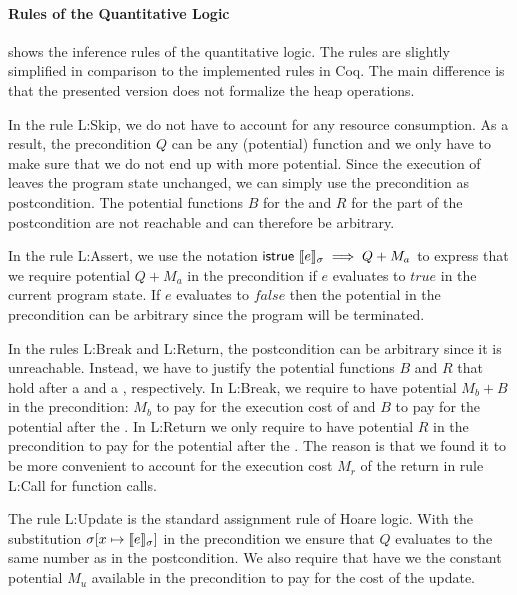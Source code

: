 \documentclass[nocopyrightspace,preprint]{sigplanconf}
\newcommand{\pref}[1]{\prettyref{#1}}
\begin{document}
\paragraph{Rules of the Quantitative Logic}

\pref{fig:logic} shows the inference rules of the quantitative logic.
The rules are slightly simplified in comparison to the implemented
rules in Coq.  The main difference is that the presented version does
not formalize the heap operations.

In the rule {\sc L:Skip}, we do not have to account for any resource
consumption.  As a result, the precondition $Q$ can be any (potential)
function and we only have to make sure that we do not end up with more
potential.  Since the execution of  leaves the program
state unchanged, we can simply use the precondition as postcondition.
The potential functions $B$ for the  and $R$ for the
 part of the postcondition are not reachable and can
therefore be arbitrary.

In the rule {\sc L:Assert}, we use the notation
$\mathsf{istrue}~\llbracket e \rrbracket_{\sigma} \implies Q + M_a$ to express that we
require potential $Q + M_a$ in the precondition if $e$ evaluates to
$\mathit{true}$ in the current program state.  If $e$ evaluates to
$\mathit{false}$ then the potential in the precondition can be
arbitrary since the program will be terminated.

In the rules {\sc L:Break} and {\sc L:Return}, the postcondition can
be arbitrary since it is unreachable.  Instead, we have to justify the
potential functions $B$ and $R$ that hold after a  and a
, respectively.  In {\sc L:Break}, we require to have
potential $M_b+B$ in the precondition: $M_b$ to pay for the execution
cost of  and $B$ to pay for the potential after the
.  In {\sc L:Return} we only require to have potential
$R$ in the precondition to pay for the potential after the
.  The reason is that we found it to be more convenient
to account for the execution cost $M_r$ of the return in rule {\sc
  L:Call} for function calls.

The rule {\sc L:Update} is the standard assignment rule of Hoare
logic.  With the substitution $\sigma[x \mapsto \llbracket e \rrbracket_{\sigma}]$ in
the precondition we ensure that $Q$ evaluates to the same number as in
the postcondition.  We also require that have we the constant
potential $M_u$ available in the precondition to pay for the cost of
the update.
\end{document}
